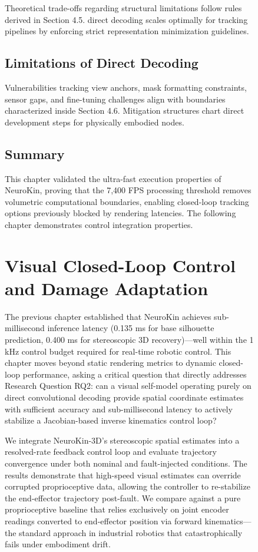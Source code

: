 \documentclass[12pt,a4paper,oneside]{report}
\begin{document}
\begin{figure}[H]
Theoretical trade-offs regarding structural limitations follow rules derived in Section 4.5. direct decoding scales optimally for tracking pipelines by enforcing strict representation minimization guidelines.

\section{Limitations of Direct Decoding}

Vulnerabilities tracking view anchors, mask formatting constraints, sensor gaps, and fine-tuning challenges align with boundaries characterized inside Section 4.6. Mitigation structures chart direct development steps for physically embodied nodes.

\section{Summary}

This chapter validated the ultra-fast execution properties of NeuroKin, proving that the 7,400 FPS processing threshold removes volumetric computational boundaries, enabling closed-loop tracking options previously blocked by rendering latencies. The following chapter demonstrates control integration properties.
\clearpage

\chapter{Visual Closed-Loop Control and Damage Adaptation}
\label{chap:closed_loop_fault_adaptation_ch5}

The previous chapter established that NeuroKin achieves sub-millisecond inference latency (0.135 ms for base silhouette prediction, 0.400 ms for stereoscopic 3D recovery)---well within the 1 kHz control budget required for real-time robotic control. This chapter moves beyond static rendering metrics to dynamic closed-loop performance, asking a critical question that directly addresses Research Question RQ2: can a visual self-model operating purely on direct convolutional decoding provide spatial coordinate estimates with sufficient accuracy and sub-millisecond latency to actively stabilize a Jacobian-based inverse kinematics control loop?

We integrate NeuroKin-3D's stereoscopic spatial estimates into a resolved-rate feedback control loop and evaluate trajectory convergence under both nominal and fault-injected conditions. The results demonstrate that high-speed visual estimates can override corrupted proprioceptive data, allowing the controller to re-stabilize the end-effector trajectory post-fault. We compare against a pure proprioceptive baseline that relies exclusively on joint encoder readings converted to end-effector position via forward kinematics---the standard approach in industrial robotics that catastrophically fails under embodiment drift.


\end{figure}
\end{document}
